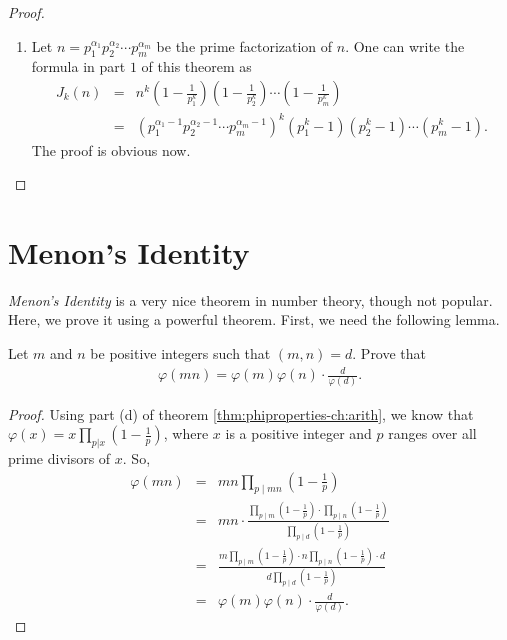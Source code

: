 \documentclass[12pt]{subfile}
\begin{document}
\begin{proof}
\begin{enumerate}
				\item Let $n = p_1^{\alpha_1}p_2^{\alpha_2} \cdots p_m^{\alpha_m}$ be the prime factorization of $n$. One can write the formula in part $1$ of this theorem as
					\begin{eqnarray*}
						J_k(n) &=& n^k \left(1 - \frac{1}{p_1^k}\right) \left(1 - \frac{1}{p_2^k}\right)\cdots \left(1 - \frac{1}{p_m^k}\right)\\
							   &=& \left(p_1^{\alpha_1- 1}p_2^{\alpha_2 -1 } \cdots p_m^{\alpha_m -1 }\right)^k \left(p_1^k -1 \right) \left(p_2^k -1 \right) \cdots \left(p_m^k -1 \right).
					\end{eqnarray*}
				The proof is obvious now.
			\end{enumerate}
		\end{proof}


\section{Menon's Identity}
	\textit{Menon's Identity} is a very nice theorem in number theory, though not popular. Here, we prove it using a powerful theorem. First, we need the following lemma.
		\begin{lemma}\label{lem:phigcd}
			Let $m$ and $n$ be positive integers such that $(m,n)=d$. Prove that
				\begin{align*}
					\varphi (mn) = \varphi (m) \varphi (n) \cdot \frac{d}{\varphi (d)}.
				\end{align*}
		\end{lemma}

		\begin{proof}
			Using part (d) of theorem \ref{thm:phiproperties-ch:arith}, we know that $\varphi(x) = x \prod\limits_{p|x} \left(1 - \frac{1}{p}\right)$, where $x$ is a positive integer and $p$ ranges over all prime divisors of $x$. So,
				\begin{eqnarray*}
					\varphi(mn) &=& mn \prod\limits_{p \mid mn} \left( 1 - \frac 1p \right)\\
								&=& mn \cdot\frac{\prod\limits_{p \mid m} \left( 1 - \frac 1p \right) \cdot \prod\limits_{p \mid n} \left( 1 - \frac 1p \right)}{\prod\limits_{p \mid d} \left( 1 - \frac 1p \right)}\\
								&=& \frac{m\prod\limits_{p \mid m} \left( 1 - \frac 1p \right) \cdot n \prod\limits_{p \mid n} \left( 1 - \frac 1p \right) \cdot d}{d\prod\limits_{p \mid d} \left( 1 - \frac 1p \right)}\\
								&=& \varphi(m)\varphi(n) \cdot \frac{d}{\varphi(d)}.
				\end{eqnarray*}
		\end{proof}
\end{document}
